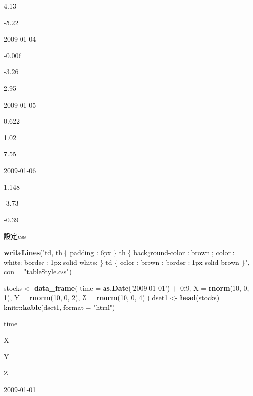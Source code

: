 \documentclass[]{book}
\newenvironment{Shaded}{\begin{snugshade}}{\end{snugshade}}
\newcommand{\DataTypeTok}[1]{\textcolor[rgb]{0.13,0.29,0.53}{#1}}
\newcommand{\DecValTok}[1]{\textcolor[rgb]{0.00,0.00,0.81}{#1}}
\newcommand{\KeywordTok}[1]{\textcolor[rgb]{0.13,0.29,0.53}{\textbf{#1}}}
\newcommand{\NormalTok}[1]{#1}
\newcommand{\OperatorTok}[1]{\textcolor[rgb]{0.81,0.36,0.00}{\textbf{#1}}}
\newcommand{\StringTok}[1]{\textcolor[rgb]{0.31,0.60,0.02}{#1}}
\theoremstyle{definition}
\theoremstyle{definition}
\theoremstyle{definition}
\theoremstyle{remark}
\begin{document}
4.13

-5.22

2009-01-04

-0.006

-3.26

2.95

2009-01-05

0.622

1.02

7.55

2009-01-06

1.148

-3.73

-0.39

設定css

\begin{Shaded}
\begin{Highlighting}[]
\KeywordTok{writeLines}\NormalTok{(}\StringTok{"td, th \{ padding : 6px \} th \{ background-color : brown ; color : white; border : 1px solid white; \} td \{ color : brown ; border : 1px solid brown \}"}\NormalTok{, }\DataTypeTok{con =} \StringTok{"tableStyle.css"}\NormalTok{)}
\end{Highlighting}
\end{Shaded}

\begin{Shaded}
\begin{Highlighting}[]
\NormalTok{stocks <-}\StringTok{ }\KeywordTok{data_frame}\NormalTok{(}
  \DataTypeTok{time =} \KeywordTok{as.Date}\NormalTok{(}\StringTok{'2009-01-01'}\NormalTok{) }\OperatorTok{+}\StringTok{ }\DecValTok{0}\OperatorTok{:}\DecValTok{9}\NormalTok{,}
  \DataTypeTok{X =} \KeywordTok{rnorm}\NormalTok{(}\DecValTok{10}\NormalTok{, }\DecValTok{0}\NormalTok{, }\DecValTok{1}\NormalTok{),}
  \DataTypeTok{Y =} \KeywordTok{rnorm}\NormalTok{(}\DecValTok{10}\NormalTok{, }\DecValTok{0}\NormalTok{, }\DecValTok{2}\NormalTok{),}
  \DataTypeTok{Z =} \KeywordTok{rnorm}\NormalTok{(}\DecValTok{10}\NormalTok{, }\DecValTok{0}\NormalTok{, }\DecValTok{4}\NormalTok{)}
\NormalTok{)}
\NormalTok{dset1 <-}\StringTok{ }\KeywordTok{head}\NormalTok{(stocks)}
\NormalTok{knitr}\OperatorTok{::}\KeywordTok{kable}\NormalTok{(dset1, }\DataTypeTok{format =} \StringTok{"html"}\NormalTok{)}
\end{Highlighting}
\end{Shaded}

time

X

Y

Z

2009-01-01
\end{document}
